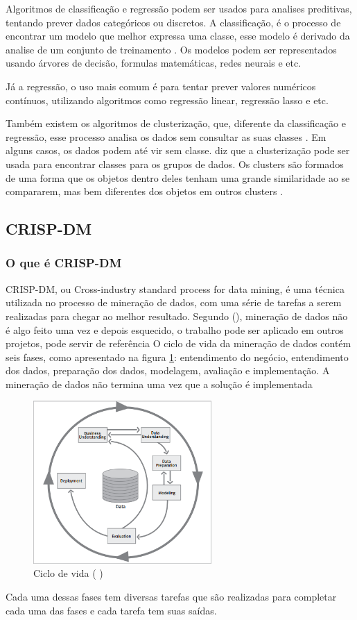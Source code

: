 Algoritmos de classificação e regressão podem ser usados para analises preditivas, tentando prever dados categóricos ou discretos. A classificação, é o processo de encontrar um modelo que melhor expressa uma classe, esse modelo é derivado da analise de um conjunto de treinamento \citep{jmj}. Os modelos podem ser representados usando árvores de decisão, formulas matemáticas, redes neurais e etc.

Já a regressão, o uso mais comum é para tentar prever valores numéricos contínuos, utilizando algoritmos como regressão linear, regressão lasso e etc.

Também existem os algoritmos de clusterização, que, diferente da classificação e regressão, esse processo analisa os dados sem consultar as suas classes \citep{jmj}. Em alguns casos, os dados podem até vir sem classe. \citeauthor{jmj} diz que a clusterização pode ser usada para encontrar classes para os grupos de dados. Os clusters são formados de uma forma que os objetos dentro deles tenham uma grande similaridade ao se compararem, mas bem diferentes dos objetos em outros clusters \citep{jmj}.

\subsection{CRISP-DM}
\subsubsection{O que é CRISP-DM}
CRISP-DM, ou Cross-industry standard process for data mining, é uma técnica utilizada no processo de mineração de dados, com uma série de tarefas a serem realizadas para chegar ao melhor resultado.
Segundo \citeauthor{dmfd} (\citeyear{dmfd}), mineração de dados não é algo feito uma vez e depois esquecido, o trabalho pode ser aplicado em outros projetos, pode servir de referência
O ciclo de vida da mineração de dados contém seis fases, como apresentado na figura \ref{crispcycle}: entendimento do negócio, entendimento dos dados, preparação dos dados, modelagem, avaliação e implementação. 
A mineração de dados não termina uma vez que a solução é implementada \citep{crispmanual}
\begin{figure}[H]
\centering
\includegraphics[height=6.2cm]{imagens/lifecycle.png}
\caption{Ciclo de vida (\citeauthor{crispmanual} \citeyear{crispmanual})}
\label{crispcycle}
\end{figure}
Cada uma dessas fases tem diversas tarefas que são realizadas para completar cada uma das fases e cada tarefa tem suas saídas.
